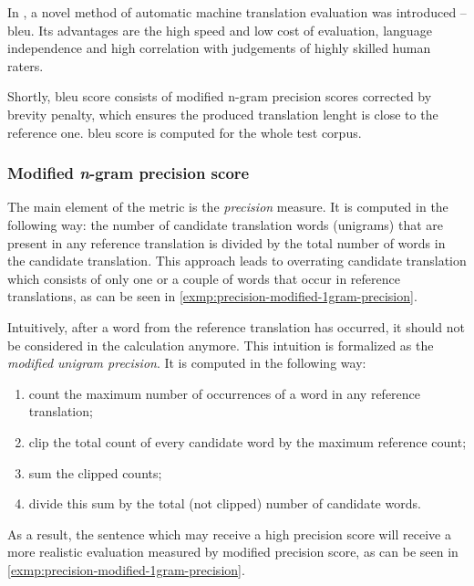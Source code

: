 In \cite{Papineni02bleu}, a novel method of automatic machine
translation evaluation was introduced -- \acrfull{bleu}.
Its advantages are the high speed and low cost of evaluation,
language independence and high correlation with judgements
of highly skilled human raters.

Shortly, \acrshort{bleu} score consists of modified n-gram precision scores
corrected by brevity penalty,
which ensures the produced translation lenght is close to the reference one.
\acrshort{bleu} score is computed for the whole test corpus.

\subsubsection*{Modified \textit{n}-gram precision score}

The main element of the metric is the \textit{precision} measure.
It is computed in the following way:
the number of candidate translation words (unigrams) that are present in
any reference translation is divided by the total number of words in the candidate translation.
This approach leads to overrating candidate translation which consists of only one
or a couple of words that occur in reference translations, as can be seen in
\cref{exmp:precision-modified-1gram-precision}.

Intuitively, after a word from the reference translation has occurred,
it should not be considered in the calculation anymore.
This intuition is formalized as the \textit{modified unigram precision}.
It is computed in the following way:
\begin{enumerate}
	\item count the maximum number of occurrences of a word in any reference translation;
	\item clip the total count of every candidate word by the maximum reference count;
	\item sum the clipped counts;
	\item divide this sum by the total (not clipped) number of candidate words.
\end{enumerate}
As a result, the sentence which may receive a high precision score will receive a
more realistic evaluation measured by modified precision score, as can be seen in
\cref{exmp:precision-modified-1gram-precision}.

